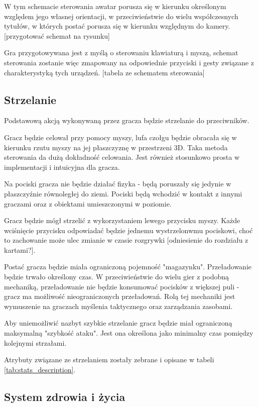 W tym schemacie sterowania awatar porusza się w kierunku określonym względem jego własnej orientacji, w przeciwieństwie do wielu współczesnych tytułów, w których postać porusza się w kierunku względnym do kamery. [przygotować schemat na rysunku]

Gra przygotowywana jest z myślą o sterowaniu klawiaturą i myszą, schemat sterowania zostanie więc zmapowany na odpowiednie przyciski i gesty związane z charakterystyką tych urządzeń. [tabela ze schematem sterowania]


\subsection{Strzelanie}\label{sec:shooting_concept}

Podstawową akcją wykonywaną przez gracza będzie strzelanie do przeciwników.

Gracz będzie celował przy pomocy myszy, lufa czołgu będzie obracała się w kierunku rzutu myszy na jej płaszczyznę w przestrzeni 3D.
Taka metoda sterowania da dużą dokładność celowania. Jest również stosunkowo prosta w implementacji i intuicyjna dla gracza.

Na pociski gracza nie będzie działać fizyka - będą poruszały się jedynie w płaszczyźnie równoległej do ziemi. Pociski będą wchodzić w kontakt z innymi graczami oraz z obiektami umieszczonymi w poziomie.

Gracz będzie mógł strzelić z wykorzystaniem lewego przycisku myszy. Każde wciśnięcie przycisku odpowiadać będzie jednemu wystrzelonwmu pociskowi, choć to zachowanie może ulec zmianie w czasie rozgrywki [odniesienie do rozdziału z kartami?].

Postać gracza będzie miała ograniczoną pojemność "magazynku". Przeładowanie będzie trwało określony czas. W przeciwieństwie do wielu gier z podobną mechaniką, przeładowanie nie będzie konsumować pocisków z większej puli - gracz ma możliwość nieograniczonych przeładowań. Rolą tej mechaniki jest wymuszenie na graczach myślenia taktycznego oraz zarządzania zasobami.

Aby uniemożliwić nazbyt szybkie strzelanie gracz będzie miał ograniczoną maksymalną "szybkość ataku". Jest ona określona jako minimalny czas pomiędzy kolejnymi strzałami.

Atrybuty związane ze strzelaniem zostały zebrane i opisane w tabeli \ref{tab:stats_description}. 

\subsection{System zdrowia i życia}

